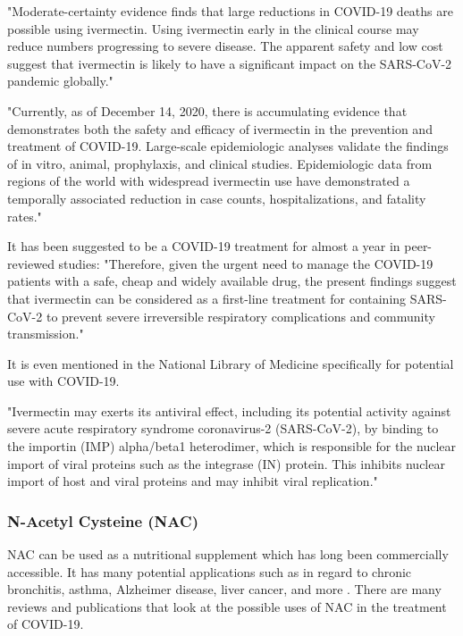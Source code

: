 \documentclass[10pt, a4paper, twocolumn]{book}
\begin{document}
"Moderate-certainty evidence finds that large reductions in COVID-19 deaths are possible using ivermectin. Using ivermectin early in the clinical course may reduce numbers progressing to severe disease. The apparent safety and low cost suggest that ivermectin is likely to have a significant impact on the SARS-CoV-2 pandemic globally." \citep{IvermectinClinicalTrials}

"Currently, as of December 14, 2020, there is accumulating evidence that demonstrates both the safety and efficacy of ivermectin in the prevention and treatment of COVID-19. Large-scale epidemiologic analyses validate the findings of in vitro, animal, prophylaxis, and clinical studies. Epidemiologic data from regions of the world with widespread ivermectin use have demonstrated a temporally associated reduction in case counts, hospitalizations, and fatality rates." \citep{ReviewOfEmergingEfficacyOfIvermectin}

It has been suggested to be a COVID-19 treatment for almost a year in peer-reviewed studies:
"Therefore, given the urgent need to manage the COVID-19 patients with a safe, cheap and widely available drug, the present findings suggest that ivermectin can be considered as a first-line treatment for containing SARS-CoV-2 to prevent severe irreversible respiratory complications and community transmission." \citep{KhanMSIIvermectin}

It is even mentioned in the National Library of Medicine specifically for potential use with COVID-19.

"Ivermectin may exerts its antiviral effect, including its potential activity against severe acute respiratory syndrome coronavirus-2 (SARS-CoV-2), by binding to the importin (IMP) alpha/beta1 heterodimer, which is responsible for the nuclear import of viral proteins such as the integrase (IN) protein. This inhibits nuclear import of host and viral proteins and may inhibit viral replication." \citep{PubChemIvermectin}
 
\subsubsection{N-Acetyl Cysteine (NAC)}

NAC can be used as a nutritional supplement which has long been commercially accessible. It has many potential applications such as in regard to chronic bronchitis, asthma, Alzheimer disease, liver cancer, and more \citep{NACVariousUses}. There are many reviews and publications that look at the possible uses of NAC in the treatment of COVID-19.
\end{document}
